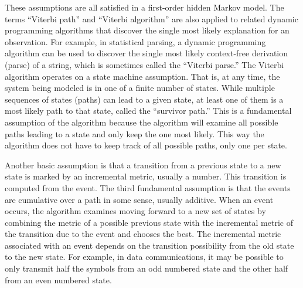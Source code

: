 \begin{multicols}{2}
     These assumptions are all satisfied in a first-order hidden Markov model.
     The terms ``Viterbi path'' and ``Viterbi algorithm'' are also applied to 
related dynamic programming algorithms that discover the single most likely 
explanation for an observation. For example, in statistical parsing, a dynamic 
programming algorithm can be used to discover the single most likely context-free 
derivation (parse) of a string, which is sometimes called the ``Viterbi parse.'' The 
Viterbi algorithm operates on a state machine assumption. That is, at any time, the 
system being modeled is in one of a finite number of states. While multiple 
sequences of states (paths) can lead to a given state, at least one of them is a most 
likely path to that state, called the ``survivor path.'' This is a fundamental 
assumption of the algorithm because the algorithm will examine all possible paths 
leading to a state and only keep the one most likely. This way the algorithm does 
not have to keep track of all possible paths, only one per state.
     
     Another basic assumption is that a transition from a previous state to a new 
state is marked by an incremental metric, usually a number. This transition is 
computed from the event. The third fundamental assumption is that the events are 
cumulative over a path in some sense, usually additive. When an event occurs, the 
algorithm examines moving forward to a new set of states by combining the metric 
of a possible previous state with the incremental metric of the transition due to the 
event and chooses the best. The incremental metric associated with an event 
depends on the transition possibility from the old state to the new state. For 
example, in data communications, it may be possible to only transmit half the 
symbols from an odd numbered state and the other half from an even numbered 
state.
     

\end{multicols}
